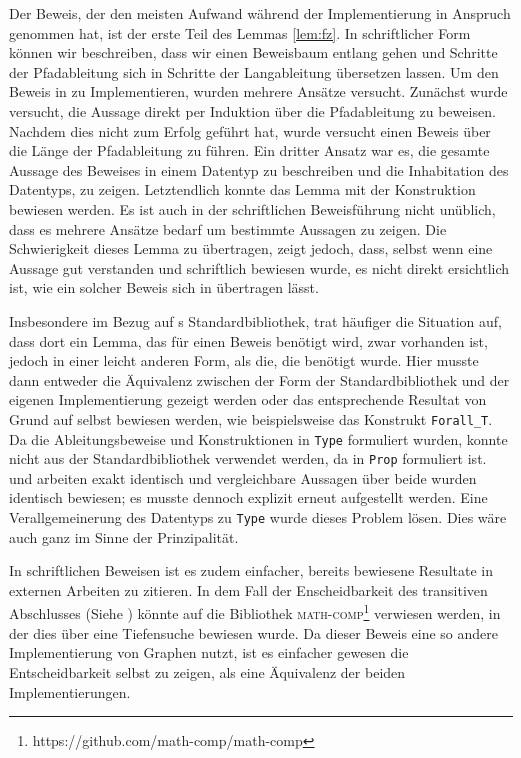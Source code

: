 Der Beweis, der den meisten Aufwand während der Implementierung in Anspruch genommen hat, ist der erste Teil des Lemmas \ref{lem:fz}. In schriftlicher Form können wir beschreiben, dass wir einen Beweisbaum entlang gehen und Schritte der Pfadableitung sich in Schritte der Langableitung übersetzen lassen. Um den Beweis in \coq{} zu Implementieren, wurden mehrere Ansätze versucht. Zunächst wurde versucht, die Aussage direkt per Induktion über die Pfadableitung zu beweisen. Nachdem dies nicht zum Erfolg geführt hat, wurde versucht einen Beweis über die Länge der Pfadableitung zu führen. Ein dritter Ansatz war es, die gesamte Aussage des Beweises in einem Datentyp zu beschreiben und die Inhabitation des Datentyps, zu zeigen. Letztendlich konnte das Lemma mit der Konstruktion  bewiesen werden. Es ist auch in der schriftlichen Beweisführung nicht unüblich, dass es mehrere Ansätze bedarf um bestimmte Aussagen zu zeigen. Die Schwierigkeit dieses Lemma zu übertragen, zeigt jedoch, dass, selbst wenn eine Aussage gut verstanden und schriftlich bewiesen wurde, es nicht direkt ersichtlich ist, wie ein solcher Beweis sich in \coq{} übertragen lässt.

Insbesondere im Bezug auf \coq s Standardbibliothek, trat häufiger die Situation auf, dass dort ein Lemma, das für einen Beweis benötigt wird, zwar vorhanden ist, jedoch in einer leicht anderen Form, als die, die benötigt wurde. Hier musste dann entweder die Äquivalenz zwischen der Form der Standardbibliothek und der eigenen Implementierung gezeigt werden oder das entsprechende Resultat von Grund auf selbst bewiesen werden, wie beispielsweise das Konstrukt \texttt{Forall\_T}. Da die Ableitungsbeweise und Konstruktionen in \texttt{Type} formuliert wurden, konnte nicht  aus der Standardbibliothek verwendet werden, da  in \texttt{Prop} formuliert ist.  und  arbeiten exakt identisch und vergleichbare Aussagen über beide wurden identisch bewiesen; es musste dennoch explizit erneut aufgestellt werden. Eine Verallgemeinerung des Datentyps  zu \texttt{Type} wurde dieses Problem lösen. Dies wäre auch ganz im Sinne der Prinzipalität. 

In schriftlichen Beweisen ist es zudem einfacher, bereits bewiesene Resultate in externen Arbeiten zu zitieren. In dem Fall der Enscheidbarkeit des transitiven Abschlusses (Siehe ) könnte auf die Bibliothek \textsc{math-comp}\footnote{https://github.com/math-comp/math-comp} verwiesen werden, in der dies über eine Tiefensuche bewiesen wurde. Da dieser Beweis eine so andere Implementierung von Graphen nutzt, ist es einfacher gewesen die Entscheidbarkeit selbst zu zeigen, als eine Äquivalenz der beiden Implementierungen.

